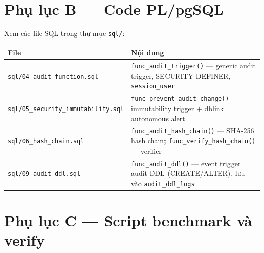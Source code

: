 \section*{Phụ lục B --- Code PL/pgSQL}

Xem các file SQL trong thư mục \texttt{sql/}:

\begin{center}
\label{tab:code-files}
\begin{tabularx}{\textwidth}{lX}
\toprule
\textbf{File} & \textbf{Nội dung} \\
\midrule
\texttt{sql/04\_audit\_function.sql} & \texttt{func\_audit\_trigger()} --- generic audit trigger, SECURITY DEFINER, \texttt{session\_user} \\
\texttt{sql/05\_security\_immutability.sql} & \texttt{func\_prevent\_audit\_change()} --- immutability trigger + dblink autonomous alert \\
\texttt{sql/06\_hash\_chain.sql} & \texttt{func\_audit\_hash\_chain()} --- SHA-256 hash chain; \texttt{func\_verify\_hash\_chain()} --- verifier \\
\texttt{sql/09\_audit\_ddl.sql} & \texttt{func\_audit\_ddl()} --- event trigger audit DDL (CREATE/ALTER), lưu vào \texttt{audit\_ddl\_logs} \\
\bottomrule
\end{tabularx}
\end{center}

\section*{Phụ lục C --- Script benchmark và verify}

